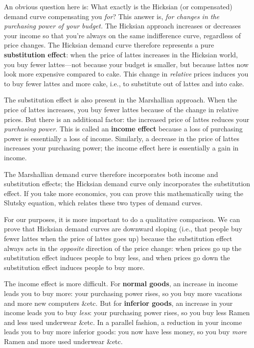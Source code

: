 An obvious question here is: What exactly is the Hicksian (or compensated) demand curve compensating you \emph{for}? This answer is, \emph{for changes in the purchasing power of your budget.} The Hicksian approach increases or decreases your income so that you're always on the same indifference curve, regardless of price changes. The Hicksian demand curve therefore represents a pure \textbf{substitution effect}: when the price of lattes increases in the Hicksian world, you buy fewer lattes---not because your budget is smaller, but because lattes now look more expensive compared to cake. This change in \emph{relative} prices induces you to buy fewer lattes and more cake, i.e., to substitute out of lattes and into cake.

The substitution effect is also present in the Marshallian approach. When the price of lattes increases, you buy fewer lattes because of the change in relative prices. But there is an additional factor: the increased price of lattes reduces your \emph{purchasing power}. This is called an \textbf{income effect} because a loss of purchasing power is essentially a loss of income. Similarly, a decrease in the price of lattes increases your purchasing power; the income effect here is essentially a gain in income.

The Marshallian demand curve therefore incorporates both income and substitution effects; the Hicksian demand curve only incorporates the substitution effect. If you take more economics, you can prove this mathematically using the Slutsky equation, which relates these two types of demand curves.

For our purposes, it is more important to do a qualitative comparison. We can prove that Hicksian demand curves are downward sloping (i.e., that people buy fewer lattes when the price of lattes goes up) because the substitution effect always acts in the \emph{opposite} direction of the price change: when prices go up the substitution effect induces people to buy less, and when prices go down the substitution effect induces people to buy more.

The income effect is more difficult. For \textbf{normal goods}, an increase in income leads you to buy more: your purchasing power rises, so you buy more vacations and more new computers \&etc. But for \textbf{inferior goods}, an increase in your income leads you to buy \emph{less}: your purchasing power rises, so you buy less Ramen and less used underwear \&etc. In a parallel fashion, a reduction in your income leads you to buy more inferior goods: you now have less money, so you buy \emph{more} Ramen and more used underwear \&etc.

